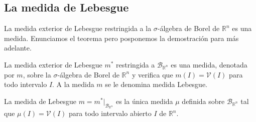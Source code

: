 \subsection{La medida de Lebesgue}
La medida exterior de Lebesgue restringida a la $\sigma$-álgebra de Borel de $\mathbb{R}^n$ es una medida. Enunciamos el teorema pero posponemos la demostración para más adelante.
\begin{teo}
    La medida exterior de Lebesgue $m^*$ restringida a $\mathcal{B}_{\mathbb{R}^n}$ es una medida, denotada por $m$, sobre la $\sigma$-álgebra de Borel de $\mathbb{R}^n$ y verifica que $m(I) = \mathcal{V}(I)$ para todo intervalo $I$. A la medida $m$ se le denomina medida Lebesgue.
\end{teo}
\begin{teo}
    La medida de Lebesgue $m = m^* |_{\mathcal{B}_{\mathbb{R}^n}}$ es la única medida $\mu$ definida sobre $\mathcal{B}_{\mathbb{R}^n}$ tal que $\mu(I) = \mathcal{V}(I)$ para todo intervalo abierto $I$ de $\mathbb{R}^n$.
\end{teo}
